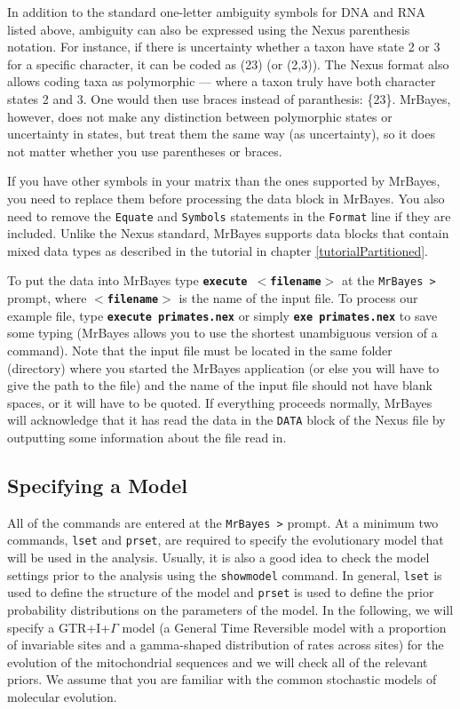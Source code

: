 \documentclass[12pt]{book}
\newcommand{\ttt}[1]{\texttt{#1}}
\newcommand{\tb}[1]{\ttt{\textbf{#1}}}
\begin{document}
In addition to the standard one-letter ambiguity symbols for DNA and RNA listed above, ambiguity
can also be expressed using the Nexus parenthesis notation. For instance, if there is uncertainty
whether a taxon have state 2 or 3 for a specific character, it can be coded as (23) (or (2,3)).
The Nexus format also allows coding taxa as polymorphic --- where a taxon truly have both character
states 2 and 3. One would then use braces instead of paranthesis: \{23\}. MrBayes, however, does
not make any distinction between polymorphic states or uncertainty in states, but treat them the
same way (as uncertainty), so it does not matter whether you use parentheses or braces.

If you have other symbols in your matrix than the ones supported by MrBayes, you need to replace
them before processing the data block in MrBayes. You also need to remove the \ttt{Equate} and
\ttt{Symbols} statements in the \ttt{Format} line if they are included. Unlike the Nexus standard,
MrBayes supports data blocks that contain mixed data types as described in the tutorial in chapter
\ref{tutorialPartitioned}.

To put the data into MrBayes type \tb{execute $<$filename$>$} at the \ttt{MrBayes >} prompt, where
\tb{$<$filename$>$} is the name of the input file. To process our example file, type \tb{execute
primates.nex} or simply \tb{exe primates.nex} to save some typing (MrBayes allows you to use the
shortest unambiguous version of a command). Note that the input file must be located in the same
folder (directory) where you started the MrBayes application (or else you will have to give the
path to the file) and the name of the input file should not have blank spaces, or it will have to
be quoted. If everything proceeds normally, MrBayes will acknowledge that it has read the data in
the \ttt{DATA} block of the Nexus file by outputting some information about the file read in.

\subsection{Specifying a Model}
All of the commands are entered at the \ttt{MrBayes >} prompt. At a minimum two commands,
\ttt{lset} and \ttt{prset}, are required to specify the evolutionary model that will be used in the
analysis. Usually, it is also a good idea to check the model settings prior to the analysis using
the \ttt{showmodel} command. In general, \ttt{lset} is used to define the structure of the model
and \ttt{prset} is used to define the prior probability distributions on the parameters of the
model. In the following, we will specify a GTR+I+$\Gamma$ model (a General Time Reversible model
with a proportion of invariable sites and a gamma-shaped distribution of rates across sites) for
the evolution of the mitochondrial sequences and we will check all of the relevant priors. We
assume that you are familiar with the common stochastic models of molecular evolution.
\end{document}
